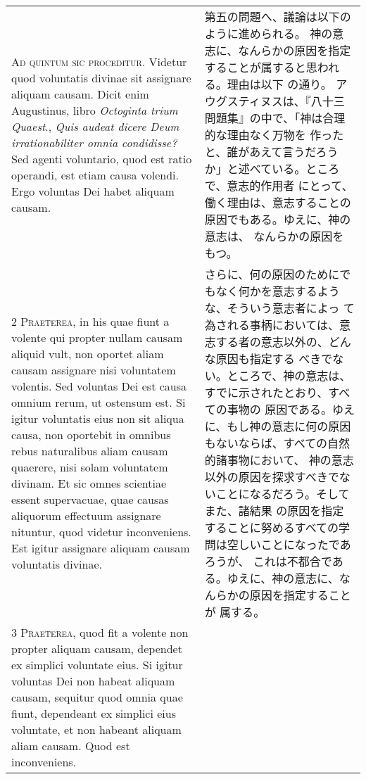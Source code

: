\documentclass[10pt]{jsarticle} %
\begin{document}
\begin{longtable}{p{21em}p{21em}}

{\huge A}{\scshape d quintum sic proceditur}. Videtur quod
voluntatis divinae sit assignare aliquam causam. Dicit enim Augustinus,
libro {\itshape Octoginta trium Quaest}., {\itshape Quis audeat dicere Deum irrationabiliter
omnia condidisse?} Sed agenti voluntario, quod est ratio operandi, est
etiam causa volendi. Ergo voluntas Dei habet aliquam causam.


&

第五の問題へ、議論は以下のように進められる。
神の意志に、なんらかの原因を指定することが属すると思われる。理由は以下
 の通り。
アウグスティヌスは、『八十三問題集』の中で、「神は合理的な理由なく万物を
 作ったと、誰があえて言うだろうか」と述べている。ところで、意志的作用者
 にとって、働く理由は、意志することの原因でもある。ゆえに、神の意志は、
 なんらかの原因をもつ。


\\


{\scshape 2 Praeterea}, in his quae fiunt a volente qui
propter nullam causam aliquid vult, non oportet aliam causam assignare
nisi voluntatem volentis. Sed voluntas Dei est causa omnium rerum, ut
ostensum est. Si igitur voluntatis eius non sit aliqua causa, non
oportebit in omnibus rebus naturalibus aliam causam quaerere, nisi solam
voluntatem divinam. Et sic omnes scientiae essent supervacuae, quae
causas aliquorum effectuum assignare nituntur, quod videtur
inconveniens. Est igitur assignare aliquam causam voluntatis divinae.


&

さらに、何の原因のためにでもなく何かを意志するような、そういう意志者によっ
 て為される事柄においては、意志する者の意志以外の、どんな原因も指定する
 べきでない。ところで、神の意志は、すでに示されたとおり、すべての事物の
 原因である。ゆえに、もし神の意志に何の原因もないならば、すべての自然的諸事物において、
神の意志以外の原因を探求すべきでないことになるだろう。そしてまた、諸結果
 の原因を指定することに努めるすべての学問は空しいことになったであろうが、
 これは不都合である。ゆえに、神の意志に、なんらかの原因を指定することが
 属する。

\\


{\scshape 3 Praeterea}, quod fit a volente non propter
aliquam causam, dependet ex simplici voluntate eius. Si igitur voluntas
Dei non habeat aliquam causam, sequitur quod omnia quae fiunt,
dependeant ex simplici eius voluntate, et non habeant aliquam aliam
causam. Quod est inconveniens.



\end{longtable}
\end{document}
